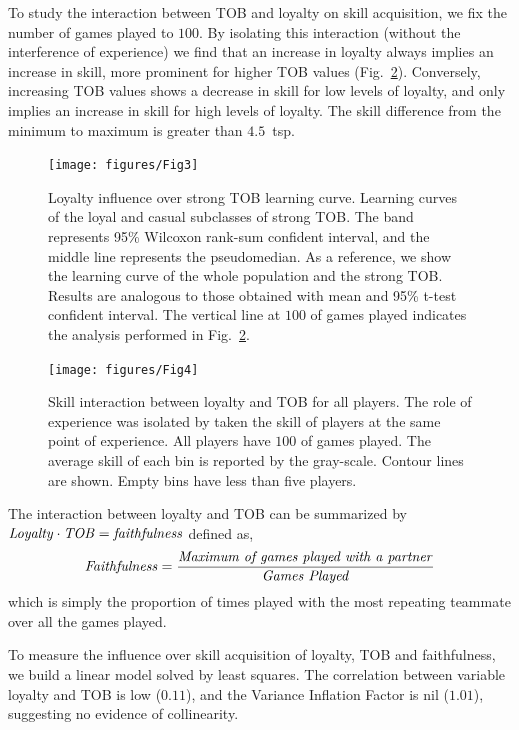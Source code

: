 \documentclass[a4paper,10pt]{book}
\theoremstyle{definition}
\begin{document}
To study the interaction between TOB and loyalty on skill acquisition, we fix the number of games played to $100$.
By isolating this interaction (without the interference of experience) we find that an increase in loyalty always implies an increase in skill, more prominent for higher TOB values (Fig.~\ref{skillModels_loyaltyTeamOriented_imageEmpirical}).
Conversely, increasing TOB values shows a decrease in skill for low levels of loyalty, and only implies an increase in skill for high levels of loyalty. 
The skill difference from the minimum to maximum is greater than $4.5$~tsp.

\begin{figure}[ht!]
\centering
\texttt{[image: figures/Fig3]}
\caption{Loyalty influence over strong TOB learning curve. Learning curves of the loyal and casual subclasses of strong TOB. The band represents 95\% Wilcoxon rank-sum confident interval, and the middle line represents the pseudomedian. As a reference, we show the learning curve of the whole population and the strong TOB. Results are analogous to those obtained with mean and 95\% t-test confident interval. The vertical line at $100$ of games played indicates the analysis performed in Fig.~\protect\ref{skillModels_loyaltyTeamOriented_imageEmpirical}.
}
\label{learningskill_pteam89_ployal}
\end{figure}

\begin{figure}[ht!]
\centering
\texttt{[image: figures/Fig4]}
\caption{Skill interaction between loyalty and TOB for all players. The role of experience was isolated by taken the skill of players at the same point of experience. All players have $100$ of games played. The average skill of each bin is reported by the gray-scale. Contour lines are shown. Empty bins have less than five players.}
\label{skillModels_loyaltyTeamOriented_imageEmpirical}
\end{figure}

The interaction between loyalty and TOB can be summarized by $ \text{\emph{Loyalty}} \cdot \text{\emph{TOB}} = \text{\emph{faithfulness}}$ defined as,
\begin{equation}
\text{\emph{Faithfulness}} = \frac{\text{\emph{Maximum of games played with a partner}}}{\text{\emph{Games Played}}}
\end{equation}
which is simply the proportion of times played with the most repeating teammate over all the games played.

To measure the influence over skill acquisition of loyalty, TOB and faithfulness, we build a linear model solved by least squares. The correlation between variable loyalty and TOB is low ($0.11$), and the Variance Inflation Factor is nil ($1.01$), suggesting no evidence of collinearity.
\end{document}
